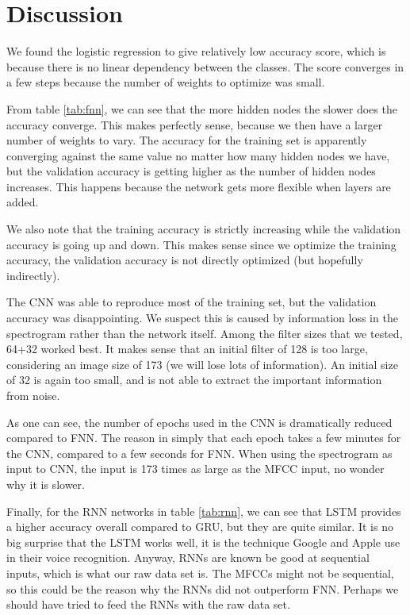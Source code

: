 \section{Discussion} \label{sec:discussion}
We found the logistic regression to give relatively low accuracy score, which is because there is no linear dependency between the classes. The score converges in a few steps because the number of weights to optimize was small. 

From table \eqref{tab:fnn}, we can see that the more hidden nodes the slower does the accuracy converge. This makes perfectly sense, because we then have a larger number of weights to vary. The accuracy for the training set is apparently converging against the same value no matter how many hidden nodes we have, but the validation accuracy is getting higher as the number of hidden nodes increases. This happens because the network gets more flexible when layers are added. 

We also note that the training accuracy is strictly increasing while the validation accuracy is going up and down. This makes sense since we optimize the training accuracy, the validation accuracy is not directly optimized (but hopefully indirectly). 

The CNN was able to reproduce most of the training set, but the validation accuracy was disappointing. We suspect this is caused by information loss in the spectrogram rather than the network itself. Among the filter sizes that we tested, 64+32 worked best. It makes sense that an initial filter of 128 is too large, considering an image size of 173 (we will lose lots of information). An initial size of 32 is again too small, and is not able to extract the important information from noise. 

As one can see, the number of epochs used in the CNN is dramatically reduced compared to FNN. The reason in simply that each epoch takes a few minutes for the CNN, compared to a few seconds for FNN. When using the spectrogram as input to CNN, the input is 173 times as large as the MFCC input, no wonder why it is slower. 

Finally, for the RNN networks in table \eqref{tab:rnn}, we can see that LSTM provides a higher accuracy overall compared to GRU, but they are quite similar. It is no big surprise that the LSTM works well, it is the technique Google and Apple use in their voice recognition. Anyway, RNNs are known be good at sequential inputs, which is what our raw data set is. The MFCCs might not be sequential, so this could be the reason why the RNNs did not outperform FNN. Perhaps we should have tried to feed the RNNs with the raw data set. 

